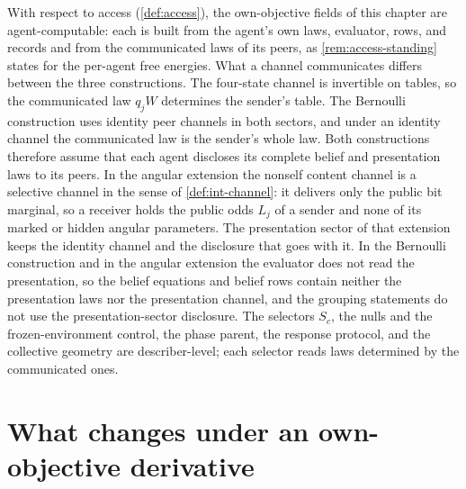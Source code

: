 With respect to access (\cref{def:access}), the own-objective fields of this chapter are agent-computable: each is built from the agent's own laws, evaluator, rows, and records and from the communicated laws of its peers, as \cref{rem:access-standing} states for the per-agent free energies. What a channel communicates differs between the three constructions. The four-state channel is invertible on tables, so the communicated law $q_jW$ determines the sender's table. The Bernoulli construction uses identity peer channels in both sectors, and under an identity channel the communicated law is the sender's whole law. Both constructions therefore assume that each agent discloses its complete belief and presentation laws to its peers. In the angular extension the nonself content channel is a selective channel in the sense of \cref{def:int-channel}: it delivers only the public bit marginal, so a receiver holds the public odds $L_j$ of a sender and none of its marked or hidden angular parameters. The presentation sector of that extension keeps the identity channel and the disclosure that goes with it. In the Bernoulli construction and in the angular extension the evaluator does not read the presentation, so the belief equations and belief rows contain neither the presentation laws nor the presentation channel, and the grouping statements do not use the presentation-sector disclosure. The selectors $S_c$, the nulls and the frozen-environment control, the phase parent, the response protocol, and the collective geometry are describer-level; each selector reads laws determined by the communicated ones.

\section{What changes under an own-objective derivative}


